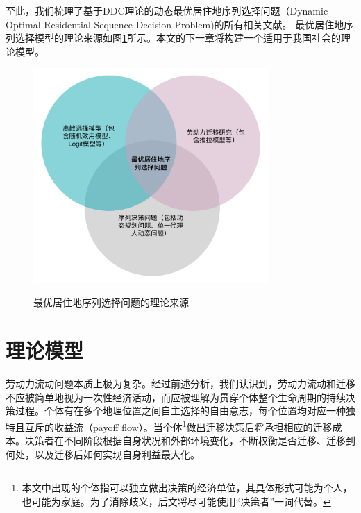\documentclass[a4paper,12pt,oneside, fontset=mac]{ctexbook} %
\begin{document}
至此，我们梳理了基于DDC理论的动态最优居住地序列选择问题（Dynamic Optimal Residential Sequence Decision Problem)的所有相关文献。
最优居住地序列选择模型的理论来源如图\ref{fig:最优居住地序列选择问题的理论来源venn diagram}所示。本文的下一章将构建一个适用于我国社会的理论模型。
\begin{figure}[!ht]
\centering
\caption{最优居住地序列选择问题的理论来源}
\includegraphics[width=0.8\textwidth]{images/optimal_residential_sequence.drawio.pdf}
\label{fig:最优居住地序列选择问题的理论来源venn diagram}
\end{figure}
























\chapter{理论模型}

劳动力流动问题本质上极为复杂。经过前述分析，我们认识到，劳动力流动和迁移不应被简单地视为一次性经济活动，而应被理解为贯穿个体整个生命周期的持续决策过程。个体有在多个地理位置之间自主选择的自由意志，每个位置均对应一种独特且互斥的收益流（payoff flow）。当个体\footnote{本文中出现的个体指可以独立做出决策的经济单位，其具体形式可能为个人，也可能为家庭。为了消除歧义，后文将尽可能使用“决策者”一词代替。}做出迁移决策后将承担相应的迁移成本。决策者在不同阶段根据自身状况和外部环境变化，不断权衡是否迁移、迁移到何处，以及迁移后如何实现自身利益最大化。
\end{document}
